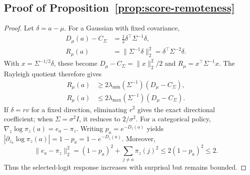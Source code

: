 
\subsection{Proof of Proposition~\ref{prop:score-remoteness}}
\label{app:proof-score-remoteness}
\begin{proof}
Let $\delta=a-\mu$. For a Gaussian with fixed covariance,
\begin{equation}
\begin{aligned}
D_\mu(a)-C_\Sigma&=\tfrac12\delta^\top\Sigma^{-1}\delta,\\
R_\mu(a)&=\|\Sigma^{-1}\delta\|_2^2
=\delta^\top\Sigma^{-2}\delta.
\end{aligned}
\end{equation}
With $x=\Sigma^{-1/2}\delta$, these become
$D_\mu-C_\Sigma=\|x\|_2^2/2$ and $R_\mu=x^\top\Sigma^{-1}x$.
The Rayleigh quotient therefore gives
\begin{equation}
\begin{aligned}
R_\mu(a)&\ge2\lambda_{\min}(\Sigma^{-1})(D_\mu-C_\Sigma),\\
R_\mu(a)&\le2\lambda_{\max}(\Sigma^{-1})(D_\mu-C_\Sigma).
\end{aligned}
\end{equation}
If $\delta=rv$ for a fixed direction, eliminating $r^2$ gives the exact directional coefficient; when $\Sigma=\sigma^2I$, it reduces to $2/\sigma^2$.
For a categorical policy, $\nabla_z\log\pi_z(a)=e_a-\pi_z$. Writing $p_a=e^{-D_z(a)}$ yields
$|\partial_{z_a}\log\pi_z(a)|=1-p_a=1-e^{-D_z(a)}$.
Moreover,
\begin{equation}
\|e_a-\pi_z\|_2^2=(1-p_a)^2+\sum_{j\ne a}\pi_z(j)^2
\le 2(1-p_a)^2\le2.
\end{equation}
Thus the selected-logit response increases with surprisal but remains bounded.
\end{proof}

